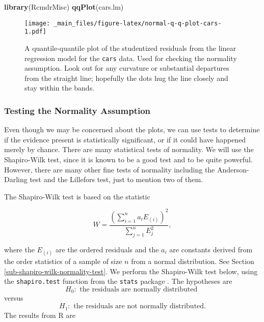 \documentclass[]{book}
\newenvironment{Shaded}{\begin{snugshade}}{\end{snugshade}}
\newcommand{\KeywordTok}[1]{\textcolor[rgb]{0.13,0.29,0.53}{\textbf{{#1}}}}
\newcommand{\NormalTok}[1]{{#1}}
\numberwithin{equation}{chapter}
\numberwithin{figure}{chapter}
\theoremstyle{plain}
\theoremstyle{definition}
\theoremstyle{remark}
\theoremstyle{definition}
\theoremstyle{definition}
\theoremstyle{remark}
\begin{document}
\begin{Shaded}
\begin{Highlighting}[]
\KeywordTok{library}\NormalTok{(RcmdrMisc)}
\KeywordTok{qqPlot}\NormalTok{(cars.lm)}
\end{Highlighting}
\end{Shaded}

\begin{figure}[htbp]
\centering
\texttt{[image: \_main\_files/figure-latex/normal-q-q-plot-cars-1.pdf]}
\caption{\label{fig:normal-q-q-plot-cars}\small A quantile-quantile plot of the
studentized residuals from the linear regression model for the
\texttt{cars} data. Used for checking the normality assumption. Look out
for any curvature or substantial departures from the straight line;
hopefully the dots hug the line closely and stay within the bands.}
\end{figure}







\subsubsection{Testing the Normality
Assumption}\label{testing-the-normality-assumption}

Even though we may be concerned about the plots, we can use tests to
determine if the evidence present is statistically significant, or if it
could have happened merely by chance. There are many statistical tests
of normality. We will use the Shapiro-Wilk test, since it is known to be
a good test and to be quite powerful. However, there are many other fine
tests of normality including the Anderson-Darling test and the Lillefors
test, just to mention two of them.

The Shapiro-Wilk test is based on the statistic

\begin{equation}
W=\frac{\left(\sum_{i=1}^{n}a_{i}E_{(i)}\right)^{2}}{\sum_{j=1}^{n}E_{j}^{2}},
\end{equation}

where the \(E_{(i)}\) are the ordered residuals and the \(a_{i}\) are
constants derived from the order statistics of a sample of size \(n\)
from a normal distribution. See Section
\ref{sub-shapiro-wilk-normality-test}. We perform the Shapiro-Wilk test
below, using the \texttt{shapiro.test} function from the \texttt{stats}
package \autocite{stats}. The hypotheses are \[
H_{0}:\mbox{ the residuals are normally distributed } \] versus \[
H_{1}:\mbox{ the residuals are not normally distributed.}  \] The
results from R are
\end{document}
